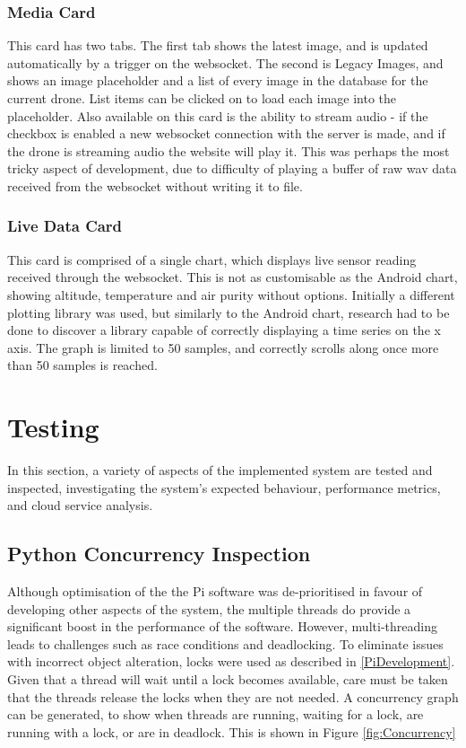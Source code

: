 \documentclass{article}
\begin{document}
\subsubsection{Media Card}
This card has two tabs. The first tab shows the latest image, and is updated automatically by a trigger on the websocket. The second is Legacy Images, and shows an image placeholder and a list of every image in the database for the current drone. List items can be clicked on to load each image into the placeholder. Also available on this card is the ability to stream audio - if the checkbox is enabled a new websocket connection with the server is made, and if the drone is streaming audio the website will play it. This was perhaps the most tricky aspect of development, due to difficulty of playing a buffer of raw wav data received from the websocket without writing it to file.

\subsubsection{Live Data Card}
This card is comprised of a single chart, which displays live sensor reading received through the websocket. This is not as customisable as the Android chart, showing altitude, temperature and air purity without options. Initially a different plotting library was used, but similarly to the Android chart, research had to be done to discover a library capable of correctly displaying a time series on the x axis. The graph is limited to 50 samples, and correctly scrolls along once more than 50 samples is reached. 



\section{Testing} \label{Testing}
In this section, a variety of aspects of the implemented system are tested and inspected, investigating the system's expected behaviour, performance metrics, and cloud service analysis.

\subsection{Python Concurrency Inspection}
Although optimisation of the the Pi software was de-prioritised in favour of developing other aspects of the system, the multiple threads do provide a significant boost in the performance of the software. However, multi-threading leads to challenges such as race conditions and deadlocking. To eliminate issues with incorrect object alteration, locks were used as described in \ref{PiDevelopment}. Given that a thread will wait until a lock becomes available, care must be taken that the threads release the locks when they are not needed. A concurrency graph can be generated, to show when threads are running, waiting for a lock, are running with a lock, or are in deadlock. This is shown in Figure \ref{fig:Concurrency}
\end{document}
